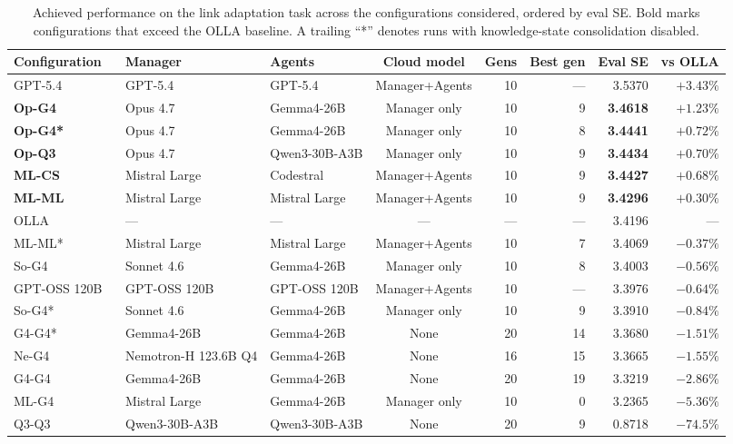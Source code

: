 \documentclass[journal]{IEEEtran}
\begin{document}
\begin{table}[t]
\centering
\caption{Achieved performance on the link adaptation task across the configurations considered, ordered by eval SE. Bold marks configurations that exceed the OLLA baseline. A trailing ``*'' denotes runs with knowledge-state consolidation disabled.}
\label{tab:results}
\footnotesize
\setlength{\tabcolsep}{4pt}
\begin{tabular}{lllcrrrr}
\hline
Configuration & Manager & Agents & Cloud model & Gens & Best gen & Eval SE & vs OLLA \\
\hline
GPT-5.4 ~\cite{aitaoudia2026aite} & GPT-5.4 & GPT-5.4 & Manager+Agents & 10 & --- & 3.5370 & $+3.43\%$ \\
\textbf{Op-G4} & Opus 4.7 & Gemma4-26B & Manager only & 10 & 9 & \textbf{3.4618} & $+1.23\%$ \\
\textbf{Op-G4*} & Opus 4.7 & Gemma4-26B & Manager only & 10 & 8 & \textbf{3.4441} & $+0.72\%$ \\
\textbf{Op-Q3} & Opus 4.7 & Qwen3-30B-A3B & Manager only & 10 & 9 & \textbf{3.4434} & $+0.70\%$ \\
\textbf{ML-CS} & Mistral Large & Codestral & Manager+Agents & 10 & 9 & \textbf{3.4427} & $+0.68\%$ \\
\textbf{ML-ML} & Mistral Large & Mistral Large & Manager+Agents & 10 & 9 & \textbf{3.4296} & $+0.30\%$ \\
OLLA ~\cite{aitaoudia2026aite} & --- & --- & --- & --- & --- & 3.4196 & --- \\
ML-ML* & Mistral Large & Mistral Large & Manager+Agents & 10 & 7 & 3.4069 & $-0.37\%$ \\
So-G4 & Sonnet 4.6 & Gemma4-26B & Manager only & 10 & 8 & 3.4003 & $-0.56\%$ \\
GPT-OSS 120B ~\cite{aitaoudia2026aite} & GPT-OSS 120B & GPT-OSS 120B & Manager+Agents & 10 & --- & 3.3976 & $-0.64\%$ \\
So-G4* & Sonnet 4.6 & Gemma4-26B & Manager only & 10 & 9 & 3.3910 & $-0.84\%$ \\
G4-G4* & Gemma4-26B & Gemma4-26B & None & 20 & 14 & 3.3680 & $-1.51\%$ \\
Ne-G4 & Nemotron-H 123.6B Q4 & Gemma4-26B & None & 16 & 15 & 3.3665 & $-1.55\%$ \\
G4-G4 & Gemma4-26B & Gemma4-26B & None & 20 & 19 & 3.3219 & $-2.86\%$ \\
ML-G4 & Mistral Large & Gemma4-26B & Manager only & 10 & 0 & 3.2365 & $-5.36\%$ \\
Q3-Q3 & Qwen3-30B-A3B & Qwen3-30B-A3B & None & 20 & 9 & 0.8718 & $-74.5\%$ \\
\hline
\end{tabular}
\end{table}
\end{document}

